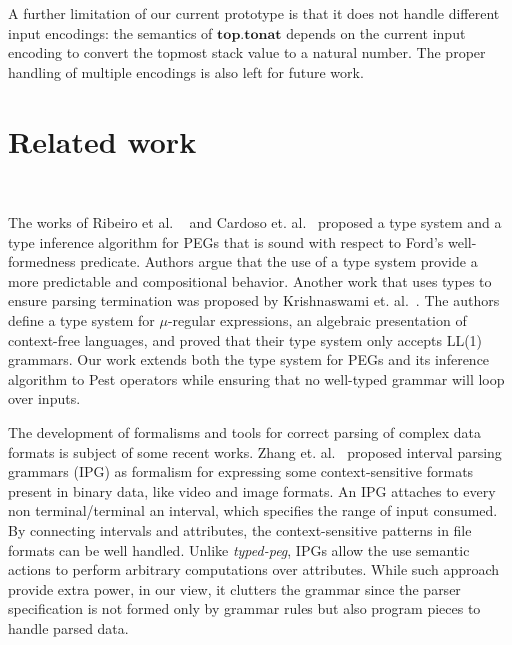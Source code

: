\documentclass[preprint,12pt]{elsarticle}
\theoremstyle{definition}
\begin{document}
A further limitation of our current prototype is that it does not handle different
input encodings: the semantics of $\mathbf{top.tonat}$ depends on the current
input encoding to convert the topmost stack value to a natural number. The proper
handling of multiple encodings is also left for future work.

\section{Related work}~\label{sec:related}

The works of Ribeiro et al. ~\cite{Ribeiro19} and Cardoso et. al.~\cite{Cardoso23}
proposed a type system and a type inference algorithm for PEGs that is sound with
respect to Ford's well-formedness predicate. Authors argue that the use
of a type system provide a more predictable and compositional behavior.
Another work that uses types to ensure parsing termination was proposed by
Krishnaswami et. al.~\cite{Krishnaswami19}. The authors define a type system
for $\mu$-regular expressions, an algebraic presentation of context-free
languages, and proved that their type system only accepts LL(1) grammars.
Our work extends both the type system for PEGs and its inference algorithm to
Pest operators while ensuring that no well-typed grammar
will loop over inputs.

The development of formalisms and tools for correct parsing of complex data
formats is subject of some recent works.  Zhang et. al.~\cite{Zhang23} proposed
interval parsing grammars (IPG) as formalism for expressing some context-sensitive
formats present in binary data, like video and image formats. An IPG attaches to
every non terminal/terminal an interval, which specifies the range of input consumed.
By connecting intervals and attributes, the context-sensitive patterns in file formats
can be well handled. Unlike \emph{typed-peg}, IPGs allow the use semantic actions to
perform arbitrary computations over attributes. While such approach provide extra
power, in our view, it clutters the grammar since the parser specification is not formed only by
grammar rules but also program pieces to handle parsed data.
\end{document}
